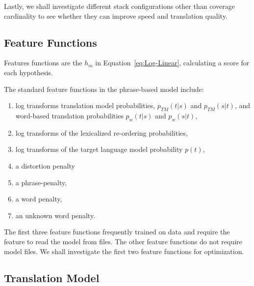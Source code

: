 \documentclass[11pt]{article}
\begin{document}
Lastly, we shall investigate different stack configurations other than coverage cardinality to see whether they can improve speed and translation quality.

\subsection{Feature Functions}

Features functions are the $h_m$ in Equation~\ref{eq:Log-Linear}, calculating a score for each hypothesis.

The standard feature functions in the phrase-based model include:
\begin{enumerate}
  \item log transforms translation model probabilities, $p_{TM}(t|s) $ and $p_{TM}(s|t)$, and word-based translation probabilities $p_w(t|s)$ and $p_w(s|t)$,
  \item log transforms of the lexicalized re-ordering probabilities,
  \item log transforms of the target language model probability $p(t)$, 
  \item a distortion penalty
  \item a phrase-penalty,
  \item a word penalty,
  \item an unknown word penalty.
\end{enumerate}

The first three feature functions frequently trained on data and require the feature to read the model from files. The other feature functions do not require model files. We shall investigate the first two feature functions for optimization.

%
\subsection{Translation Model}
\end{document}
